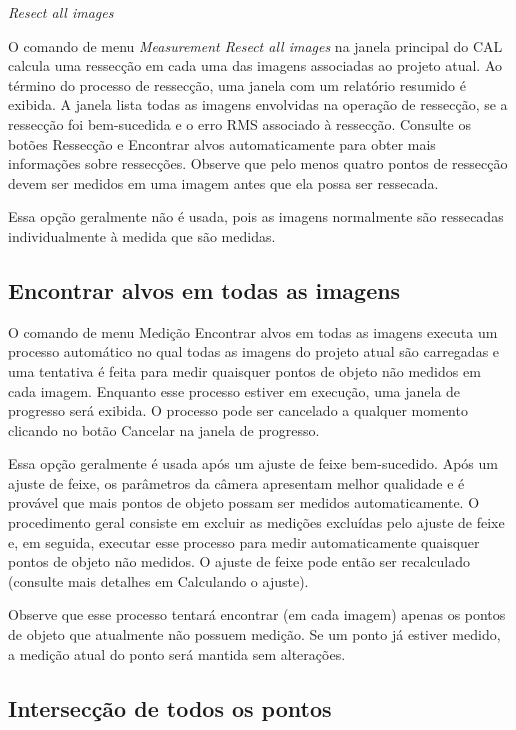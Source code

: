 \documentclass[
  12pt,
  letterpaper,
  DIV=11,
  numbers=noendperiod]{scrreprt}
\begin{document}
\emph{Resect all images}

O comando de menu \emph{Measurement \textbar{} Resect all images} na
janela principal do CAL calcula uma ressecção em cada uma das imagens
associadas ao projeto atual. Ao término do processo de ressecção, uma
janela com um relatório resumido é exibida. A janela lista todas as
imagens envolvidas na operação de ressecção, se a ressecção foi
bem-sucedida e o erro RMS associado à ressecção. Consulte os botões
Ressecção e Encontrar alvos automaticamente para obter mais informações
sobre ressecções. Observe que pelo menos quatro pontos de ressecção
devem ser medidos em uma imagem antes que ela possa ser ressecada.

Essa opção geralmente não é usada, pois as imagens normalmente são
ressecadas individualmente à medida que são medidas.

\subsection{Encontrar alvos em todas as
imagens}\label{encontrar-alvos-em-todas-as-imagens}

O comando de menu Medição \textbar{} Encontrar alvos em todas as imagens
executa um processo automático no qual todas as imagens do projeto atual
são carregadas e uma tentativa é feita para medir quaisquer pontos de
objeto não medidos em cada imagem. Enquanto esse processo estiver em
execução, uma janela de progresso será exibida. O processo pode ser
cancelado a qualquer momento clicando no botão Cancelar na janela de
progresso.

Essa opção geralmente é usada após um ajuste de feixe bem-sucedido. Após
um ajuste de feixe, os parâmetros da câmera apresentam melhor qualidade
e é provável que mais pontos de objeto possam ser medidos
automaticamente. O procedimento geral consiste em excluir as medições
excluídas pelo ajuste de feixe e, em seguida, executar esse processo
para medir automaticamente quaisquer pontos de objeto não medidos. O
ajuste de feixe pode então ser recalculado (consulte mais detalhes em
Calculando o ajuste).

Observe que esse processo tentará encontrar (em cada imagem) apenas os
pontos de objeto que atualmente não possuem medição. Se um ponto já
estiver medido, a medição atual do ponto será mantida sem alterações.

\subsection{Intersecção de todos os
pontos}\label{intersecuxe7uxe3o-de-todos-os-pontos}
\end{document}
